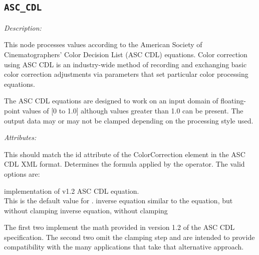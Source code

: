\subsection{\texttt{ASC\_CDL}}

\emph{Description:} \par
This node processes values according to the American Society of Cinematographers' Color Decision List (ASC CDL) equations. Color correction using ASC CDL is an industry-wide method of recording and exchanging basic color correction adjustments via parameters that set particular color processing equations.

The ASC CDL equations are designed to work on an input domain of floating-point values of [0 to 1.0] although values greater than 1.0 can be present. The output data may or may not be clamped depending on the processing style used.


\emph{Attributes:}
\begin{xmlfields}
    \xmlitem[id][optional] This should match the id attribute of the ColorCorrection element in the ASC CDL XML format.
    \xmlitem[style][optional] Determines the formula applied by the operator. The valid options are:
        \begin{xmlfields}
            \xmlitemd["Fwd"] implementation of v1.2 ASC CDL equation. \\
            This is the default value for .
            \xmlitemd["Rev"] inverse equation
            \xmlitemd["FwdNoClamp"] similar to the  equation, but without clamping
            \xmlitemd["RevNoClamp"] inverse equation, without clamping
        \end{xmlfields}
        The first two implement the math provided in version 1.2 of the ASC CDL specification.  The second two omit the clamping step and are intended to provide compatibility with the many applications that take that alternative approach.
\end{xmlfields}

